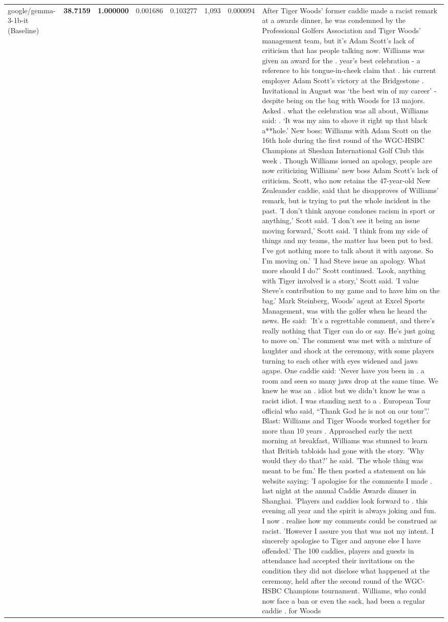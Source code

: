 \begin{table}[H]
\begin{tabular}{llrlllll}
google/gemma-3-1b-it (Baseline) & \bfseries 38.7159 & \bfseries 1.000000 & 0.001686 & 0.103277 & 1,093 & 0.000094 & After Tiger Woods' former caddie made a racist remark at a awards dinner, he was condemned by the Professional Golfers Association and Tiger Woods' management team, but it's Adam Scott's lack of criticism that has people talking now. Williams was given an award for the . year’s best celebration - a reference to his tongue-in-cheek claim that . his current employer Adam Scott’s victory at the Bridgestone . Invitational in August was ‘the best win of my career’ - despite being on the bag with Woods for 13 majors. Asked . what the celebration was all about, Williams said: . ‘It was my aim to shove it right up that black a**hole.’ New boss: Williams with Adam Scott  on the 16th hole during the first round of the WGC-HSBC Champions at Sheshan International Golf Club this week . Though Williams issued an apology, people are now criticizing Williams' new boss Adam Scott's lack of criticism. Scott, who now retains the 47-year-old New Zealeander caddie, said that he disapproves of Williams' remark, but is trying to put the whole incident in the past. 'I don't think anyone condones racism in sport or anything,' Scott said. 'I don't see it being an issue moving forward,' Scott said. 'I think from my side of things and my teams, the matter has been put to bed. I've got nothing more to talk about it with anyone. So I'm moving on.' 'I had Steve issue an apology. What more should I do?' Scott continued. 'Look, anything with Tiger involved is a story,' Scott said. 'I value Steve's contribution to my game and to have him on the bag.' Mark Steinberg, Woods' agent at Excel Sports Management, was with the golfer when he heard the news. He said: 'It's a regrettable comment, and there's really nothing that Tiger can do or say. He's just going to move on.' The comment was met with a mixture of laughter and shock at the ceremony, with some players turning to each other with eyes widened and jaws agape. One caddie said: ‘Never have you been in . a room and seen so many jaws drop at the same time. We knew he was an . idiot but we didn’t know he was a racist idiot. I was standing next to a . European Tour official who said, “Thank God he is not on our tour”.’ Blast: Williams and Tiger Woods worked together for more than 10 years . Approached early the next morning at breakfast, Williams was stunned to learn that British tabloids had gone with the story. 'Why would they do that?' he said. 'The whole thing was meant to be fun.' He then posted a statement on his website saying: 'I apologise for the comments I made . last night at the annual Caddie Awards dinner in Shanghai. 'Players and caddies look forward to . this evening all year and the spirit is always joking and fun. I now . realise how my comments could be construed as racist. 'However I assure you that was not my intent. I sincerely apologise to Tiger and anyone else I have offended.' The 100 caddies, players and guests in attendance had accepted their invitations on the condition they did not disclose what happened at the ceremony, held after the second round of the WGC-HSBC Champions tournament. Williams, who could now face a ban or even the sack, had been a regular caddie . for Woods 
\end{tabular}
\end{table}
